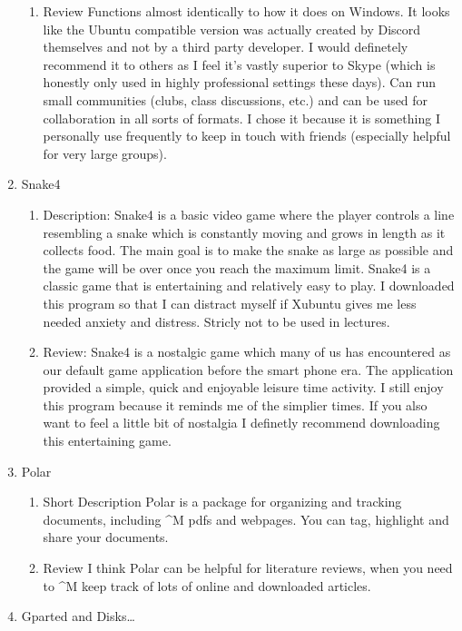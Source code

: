\documentclass{article}
\begin{document}
\begin{enumerate}
\begin{enumerate}
\item Review
\label{sec:org19ff716}
Functions almost identically to how it does on Windows. It looks like the Ubuntu compatible version was actually created by Discord themselves and not by a third party developer. I would definetely recommend it to others as I feel it's vastly superior to Skype (which is honestly only used in highly professional settings these days). Can run small communities (clubs, class discussions, etc.) and can be used for collaboration in all sorts of formats. I chose it because it is something I personally use frequently to keep in touch with friends (especially helpful for very large groups).
\end{enumerate}
\item Snake4
\label{sec:orgcc19d18}
\begin{enumerate}
\item Description:
\label{sec:org440b0be}
Snake4 is a basic video game where the player controls a line resembling a snake which is constantly moving and grows in length as it collects food. The main goal is to make the snake as large as possible and the game will be over once you reach the maximum limit. Snake4 is a classic game that is entertaining and relatively easy to play. I downloaded this program so that I can distract myself if Xubuntu gives me less needed anxiety and distress. Stricly not to be used in lectures.
\item Review:
\label{sec:org10278cd}
Snake4 is a nostalgic game which many of us has encountered as our default game application before the smart phone era. The application provided a simple, quick and enjoyable leisure time activity. I still enjoy this program because it reminds me of the simplier times. If you also want to feel a little bit of nostalgia I definetly recommend downloading this entertaining game.
\end{enumerate}
\item Polar
\label{sec:org9347b26}
\begin{enumerate}
\item Short Description
\label{sec:orgd9c7087}
      Polar is a package for organizing and tracking documents, including \^{}M
pdfs and webpages. You can tag, highlight and share your documents.
\item Review
\label{sec:org22267e8}
      I think Polar can be helpful for literature reviews, when you need to \^{}M
keep track of lots of online and downloaded articles.
\end{enumerate}
\item Gparted and Disks\ldots{}

\end{enumerate}
\end{document}
